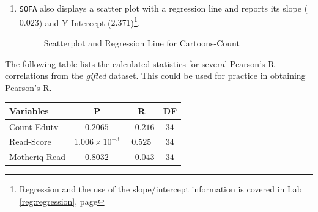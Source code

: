 \begin{enumerate}
  \item \texttt{SOFA} also displays a scatter plot with a regression line and reports its slope ($ 0.023 $) and Y-Intercept ($ 2.371 $)\footnote{Regression and the use of the slope/intercept information is covered in Lab \ref{reg:regression}, page \pageref{reg:regression}}. 

  \begin{figure}[H]
    \begin{center}
      \caption{Scatterplot and Regression Line for Cartoons-Count}
    \end{center}
  \end{figure}

\end{enumerate}

The following table lists the calculated statistics for several Pearson's R correlations from the \textit{gifted} dataset. This could be used for practice in obtaining Pearson's R.

\begin{center}
  \begin{tabular}{lccc}
    \hline 
    \textbf{Variables} & \textbf{P} & \textbf{R} & \textbf{DF} \\ 
    \hline 
    Count-Edutv     & $ 0.2065 $ & $ -0.216 $ & $ 34 $ \\ 
    Read-Score      & $ 1.006 \times 10^{-3} $ & $  0.525 $ & $ 34 $ \\ 
    Motheriq-Read   & $ 0.8032 $ & $ -0.043 $ & $ 34 $ \\ 
    \hline 
  \end{tabular} 
\end{center}

